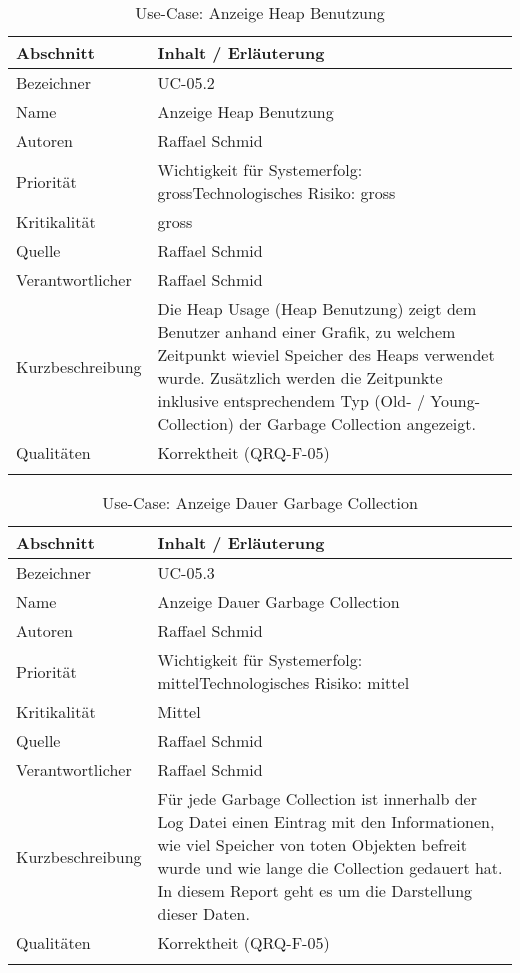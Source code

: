\begin{longtable}{|p{4cm}|p{10.5cm}|}
\hline
   \textbf{Abschnitt} & \textbf{Inhalt / Erläuterung} \\\hline
   Bezeichner & UC-05.2\\\hline
   Name & Anzeige Heap Benutzung\\\hline
   Autoren & Raffael Schmid\\\hline
   Priorität & Wichtigkeit für Systemerfolg: gross\newline Technologisches Risiko: gross\\\hline
   Kritikalität & gross\\\hline
   Quelle & Raffael Schmid\\\hline
   Verantwortlicher & Raffael Schmid\\\hline
   Kurzbeschreibung & Die Heap Usage (Heap Benutzung) zeigt dem Benutzer anhand einer Grafik, zu welchem Zeitpunkt wieviel Speicher des Heaps verwendet wurde. Zusätzlich werden die Zeitpunkte inklusive entsprechendem Typ (Old- / Young-Collection) der Garbage Collection angezeigt.  \\\hline
   Qualitäten & Korrektheit (QRQ-F-05)\\\hline
\caption{Use-Case: Anzeige Heap Benutzung}
\end{longtable}

\begin{longtable}{|p{4cm}|p{10.5cm}|}
\hline
   \textbf{Abschnitt} & \textbf{Inhalt / Erläuterung} \\\hline
   Bezeichner & UC-05.3\\\hline
   Name & Anzeige Dauer Garbage Collection\\\hline
   Autoren & Raffael Schmid\\\hline
   Priorität & Wichtigkeit für Systemerfolg: mittel\newline Technologisches Risiko: mittel\\\hline
   Kritikalität & Mittel\\\hline
   Quelle & Raffael Schmid\\\hline
   Verantwortlicher & Raffael Schmid\\\hline
   Kurzbeschreibung & Für jede Garbage Collection ist innerhalb der Log Datei einen Eintrag mit den Informationen, wie viel Speicher von toten Objekten befreit wurde und wie lange die Collection gedauert hat. In diesem Report geht es um die Darstellung dieser Daten.\\\hline
   Qualitäten & Korrektheit (QRQ-F-05)\\\hline
\caption{Use-Case: Anzeige Dauer Garbage Collection}
\end{longtable}

